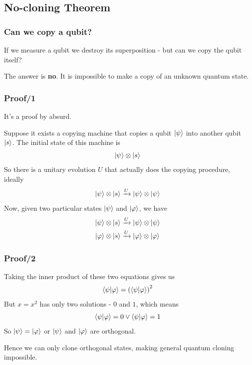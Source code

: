 \documentclass{beamer}
\begin{document}
  \subsection{No-cloning Theorem}
  \begin{frame}
    \frametitle{Can we copy a qubit?}
    If we measure a qubit we destroy its superposition - but can we copy the qubit itself?
    
    The answer is \textbf{no}. It is impossible to make a copy of an unknown quantum state.
  \end{frame}
  \begin{frame}
    \frametitle{Proof/1}
    It's a proof by absurd.

    Suppose it exists a copying machine that copies a qubit $\ket{\psi}$ into another qubit $\ket{s}$.
    The initial state of this machine is
    \begin{equation*}
      \ket{\psi} \otimes \ket{s}
    \end{equation*}
    So there is a unitary evolution $U$ that actually does the copying procedure, ideally
    \begin{equation*}
      \ket{\psi} \otimes \ket{s} \xrightarrow{U} \ket{\psi} \otimes \ket{\psi}
    \end{equation*}
    Now, given two particular states $\ket{\psi}$ and $\ket{\varphi}$, we have
    \begin{align*}
      \ket{\psi}\otimes\ket{s} &\xrightarrow{U} \ket{\psi}\otimes\ket{\psi} \\
      \ket{\varphi}\otimes\ket{s} &\xrightarrow{U} \ket{\varphi}\otimes\ket{\varphi}
    \end{align*}
  \end{frame}
  \begin{frame}
    \frametitle{Proof/2}
    Taking the inner product of these two equations gives us
    \begin{equation*}
      \braket{\psi|\varphi} = \left(\braket{\psi|\varphi}\right)^2
    \end{equation*}
    But $x = x^2$ has only two solutions - $0$ and $1$, which means
    \begin{equation*}
      \braket{\psi|\varphi} = 0 \vee \braket{\psi|\varphi} = 1
    \end{equation*}
    So $\ket{\psi} = \ket{\varphi}$ or $\ket{\psi}$ and $\ket{\varphi}$ are orthogonal.

    Hence we can only clone orthogonal states, making general quantum cloning impossible.
  \end{frame}
\end{document}
